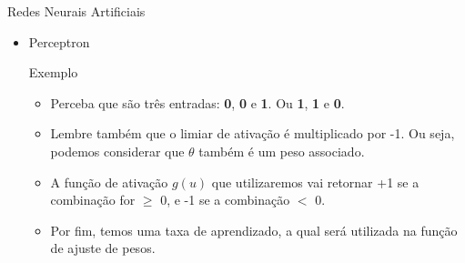 \documentclass{libs/ufc_format}
\begin{document}
\begin{frame}{Redes Neurais Artificiais}
    \begin{itemize}
        \item Perceptron\\
        \begin{exampleblock}{Exemplo}
            \begin{itemize}
                \justifying
                \item Perceba que são três entradas: \textbf{0}, \textbf{0} e \textbf{1}. Ou \textbf{1}, \textbf{1} e \textbf{0}.
                \item<2-> Lembre também que o limiar de ativação é multiplicado por -1. Ou seja, podemos considerar que $\theta$ também é um peso associado.
                \item<3-> A função de ativação $g(u)$ que utilizaremos vai retornar +1 se a combinação for $\ge$ 0, e -1 se a combinação $<$ 0.
                \item<4-> Por fim, temos uma taxa de aprendizado, a qual será utilizada na função de ajuste de pesos.
            \end{itemize}
        \end{exampleblock}
    \end{itemize}
\end{frame}
\end{document}
